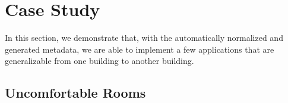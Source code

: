 \section{Case Study}
In this section, we demonstrate that, with the automatically normalized and generated metadata, we are able to implement a few applications that are generalizable from one building to another building.

\subsection{Uncomfortable Rooms}


